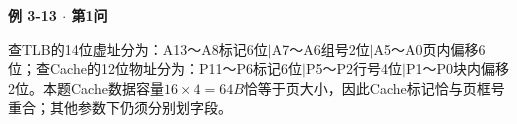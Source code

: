 {\color{ink}\bfseries 例 3-13 \(\cdot \) 第1问}\par\vspace{1bp}查TLB的14位虚址分为：A13～A8标记6位\(|\)A7～A6组号2位\(|\)A5～A0页内偏移6位；查Cache的12位物址分为：P11～P6标记6位\(|\)P5～P2行号4位\(|\)P1～P0块内偏移2位。本题Cache数据容量\(16\times 4=\allowbreak{}64 B\)恰等于页大小，因此Cache标记恰与页框号重合；其他参数下仍须分别划字段。
